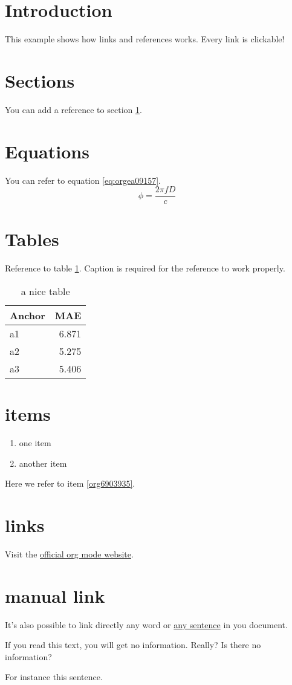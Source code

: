 


\section{Introduction}
\label{sec:org52a0f90}
This example shows how links and references works.
Every link is clickable!

\section{Sections}
\label{sec:org6b58318}
You can add a reference to section \ref{sec:org52a0f90}.

\section{Equations}
\label{sec:org9146f4a}
You can refer to equation \ref{eq:orgea09157}.
\begin{equation}
\label{eq:orgea09157}
\phi = \frac{2\pi fD}{c}
\end{equation}

\section{Tables}
\label{sec:orgc4b7d6b}
Reference to table \ref{tab:org1a97916}.
Caption is required for the reference to work properly.

\begin{table}[htbp]
\caption{\label{tab:org1a97916}
a nice table}
\centering
\begin{tabular}{lr}
Anchor & MAE\\
\hline
a1 & 6.871\\
a2 & 5.275\\
a3 & 5.406\\
\end{tabular}
\end{table}

\section{items}
\label{sec:org9add13a}
\begin{enumerate}
\item one item
\item \label{org6903935}another item
\end{enumerate}
Here we refer to item \ref{org6903935}.

\section{links}
\label{sec:orgcfab6d5}
Visit the \href{https://orgmode.org/}{official org mode website}.

\section{manual link}
\label{sec:org48eec62}
It's also possible to link directly any word
or \hyperlink{thesentence}{any sentence} in you document.

If you read this text, you will get no information.  Really?
Is there no information?

For instance \hypertarget{thesentence}{this sentence}.


